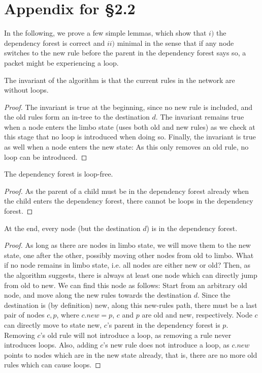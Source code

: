 \section{Appendix for \S2.2}

In the following, we prove a few simple lemmas, which show that $i)$ the dependency forest is correct and $ii)$ minimal in the sense that if any node switches to the new rule before the parent in the dependency forest says so, a packet might be experiencing a loop.

\begin{lemma}\label{lemma:invariant} The invariant of the algorithm is that the current rules in the network are without loops.
\end{lemma}

\begin{proof} The invariant is true at the beginning, since no new rule is included, and the old rules form an in-tree to the destination $d$. The invariant remains true when a node enters the limbo state (uses both old and new rules) as we check at this stage that no loop is introduced when doing so. Finally, the invariant is true as well when a node enters the new state: As this only removes an old rule, no loop can be introduced.
\end{proof}

\begin{lemma}\label{lemma:loop-free} The dependency forest is loop-free.
\end{lemma}

\begin{proof} As the parent of a child must be in the dependency forest already when the child enters the dependency forest, there cannot be loops in the dependency forest.
\end{proof}

\begin{lemma}\label{lemma:forest} At the end, every node (but the destination $d$) is in the dependency forest.
\end{lemma}

\begin{proof} As long as there are nodes in limbo state, we will move them to the new state, one after the other, possibly moving other nodes from old to limbo. What if no node remains in limbo state, i.e. all nodes are either new or old? Then, as the algorithm suggests, there is always at least one node which can directly jump from old to new. We can find this node as follows: Start from an arbitrary old node, and move along the new rules towards the destination $d$. Since the destination is (by definition) new, along this new-rules path, there must be a last pair of nodes $c,p$, where $c.new = p$, $c$ and $p$ are old and new, respectively. Node $c$ can directly move to state new, $c$'s parent in the dependency forest is $p$. Removing $c$'s old rule will not introduce a loop, as removing a rule never introduces loops. Also, adding $c$'s new rule does not introduce a loop, as $c.new$ points to nodes which are in the new state already, that is, there are no more old rules which can cause loops.
\end{proof}

